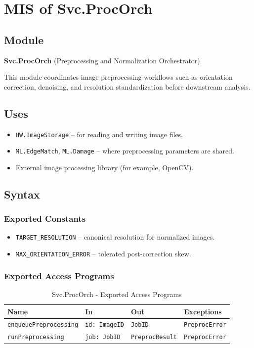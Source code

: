 \documentclass[12pt, titlepage]{article}
\begin{document}
\section{MIS of Svc.ProcOrch} \label{Svc.ProcOrch}

\subsection{Module}
\textbf{Svc.ProcOrch} \; (Preprocessing and Normalization Orchestrator)

This module coordinates image preprocessing workflows such as orientation correction, denoising, and resolution standardization before downstream analysis.

\subsection{Uses}
\begin{itemize}
    \item \texttt{HW.ImageStorage} – for reading and writing image files.
    \item \texttt{ML.EdgeMatch}, \texttt{ML.Damage} – where preprocessing parameters are shared.
    \item External image processing library (for example, OpenCV).
\end{itemize}

\subsection{Syntax}

\subsubsection{Exported Constants}
\begin{itemize}
    \item \texttt{TARGET\_RESOLUTION} – canonical resolution for normalized images.
    \item \texttt{MAX\_ORIENTATION\_ERROR} – tolerated post-correction skew.
\end{itemize}

\subsubsection{Exported Access Programs}

\begin{table}[H]
\centering
\small
\caption{Svc.ProcOrch - Exported Access Programs}
\begin{tabular}{p{4cm} p{3cm} p{3.5cm} p{3.5cm}}
\toprule
\textbf{Name} & \textbf{In} & \textbf{Out} & \textbf{Exceptions} \\
\midrule
\texttt{enqueuePreprocessing} & \texttt{id: ImageID} & \texttt{JobID} & \texttt{PreprocError} \\
\texttt{runPreprocessing} & \texttt{job: JobID} & \texttt{PreprocResult} & \texttt{PreprocError} \\
\bottomrule
\end{tabular}
\end{table}
\end{document}
